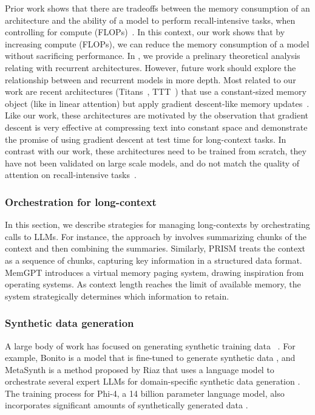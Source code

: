Prior work shows that there are tradeoffs between the memory consumption of an architecture and the ability of a model to perform recall-intensive tasks, when controlling for compute (\ie FLOPs)~\cite{arora2024simple}.
In this context, our work shows that by increasing compute (\ie FLOPs), we can reduce the memory consumption of a model without sacrificing performance.
In , we provide a prelinary theoretical analysis relating \method with recurrent architectures. However, future work should explore the relationship between \artifacts and recurrent models in more depth.
Most related to our work are recent architectures (\eg Titans~\cite{behrouz2024titans}, TTT~\cite{sun2024learning}) that use a constant-sized memory object (like in linear attention) but apply gradient descent-like memory updates~\cite{sun2024learning,yang2025parallelizinglineartransformersdelta,behrouz2025atlas,behrouz2024titans,behrouz2025s}.
Like our work, these architectures are motivated by the observation that gradient descent is very effective at compressing text into constant space and demonstrate the promise of using gradient descent at test time for long-context tasks.
In contrast with our work, these architectures need to be trained from scratch, they have not been validated on large scale models, and do not match the quality of attention on recall-intensive tasks~\cite{arora2024simple,behrouz2025atlas}.
\subsubsection{Orchestration for long-context}
In this section, we describe strategies for managing long-contexts by orchestrating calls to LLMs.
For instance, the approach by \citep{russak2024writing} involves summarizing chunks of the context and then combining the summaries. Similarly, PRISM \citep{jayalath2024long} treats the context as a sequence of chunks, capturing key information in a structured data format. MemGPT \citep{packer2023memgpt} introduces a virtual memory paging system, drawing inspiration from operating systems. As context length reaches the limit of available memory, the system strategically determines which information to retain.
\subsubsection{Synthetic data generation}
A large body of work has focused on generating synthetic training data ~\cite{nayak2024learning, abdin2024phi,gandhi2024datatune,riaz2025metasynth}. For example, Bonito is a model that is fine-tuned to generate synthetic data \cite{nayak2024learning}, and MetaSynth is a method proposed by Riaz \etal that uses a language model to orchestrate several expert LLMs for domain-specific synthetic data generation \cite{riaz2025metasynth}. The training process for Phi-4, a 14 billion parameter language model, also incorporates significant amounts of synthetically generated data \cite{abdin2024phi}.


